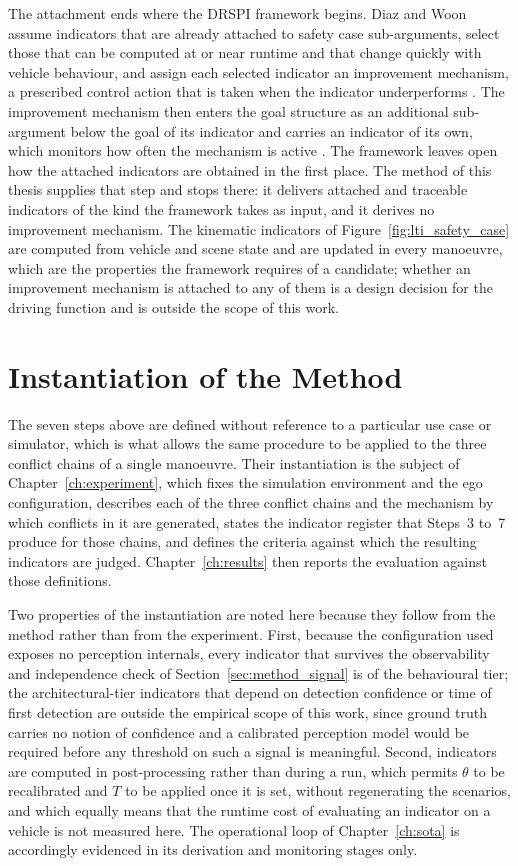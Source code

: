 The attachment ends where the \ac{DRSPI} framework begins. Diaz and Woon assume
indicators that are already attached to safety case sub-arguments, select those
that can be computed at or near runtime and that change quickly with vehicle
behaviour, and assign each selected indicator an improvement mechanism, a
prescribed control action that is taken when the indicator underperforms
\cite{diaz2022drspi}. The improvement mechanism then enters the goal structure as an
additional sub-argument below the goal of its indicator and carries an indicator of
its own, which monitors how often the mechanism is active \cite{diaz2022drspi}. The
framework leaves open how the attached indicators are obtained in the first place.
The method of this thesis supplies that step and stops there: it delivers attached
and traceable indicators of the kind the framework takes as input, and it derives no
improvement mechanism. The kinematic indicators of
Figure~\ref{fig:lti_safety_case} are computed from vehicle and scene state and are
updated in every manoeuvre, which are the properties the framework requires of a
candidate; whether an improvement mechanism is attached to any of them is a design
decision for the driving function and is outside the scope of this work.

\section{Instantiation of the Method}
\label{sec:method_carla}

The seven steps above are defined without reference to a particular use case or
simulator, which is what allows the same procedure to be applied to the three conflict
chains of a single manoeuvre. Their instantiation is the subject of
Chapter~\ref{ch:experiment}, which fixes the simulation environment and the ego
configuration, describes each of the three conflict chains and the mechanism by which
conflicts in it are generated, states the indicator register that Steps~3 to~7 produce
for those chains, and defines the criteria against which the resulting indicators are
judged. Chapter~\ref{ch:results} then reports the evaluation against those definitions.

Two properties of the instantiation are noted here because they follow from the method
rather than from the experiment. First, because the configuration used exposes no
perception internals, every indicator that survives the observability and independence
check of Section~\ref{sec:method_signal} is of the behavioural tier; the
architectural-tier indicators that depend on detection confidence or time of first
detection are outside the empirical scope of this work, since ground truth carries no
notion of confidence and a calibrated perception model would be required before any
threshold on such a signal is meaningful. Second, indicators are computed in
post-processing rather than during a run, which permits $\theta$ to be recalibrated
and $T$ to be applied once it is set, without regenerating the scenarios, and which equally means that the
runtime cost of evaluating an indicator on a vehicle is not measured here. The
operational loop of Chapter~\ref{ch:sota} is accordingly evidenced in its derivation and
monitoring stages only.

